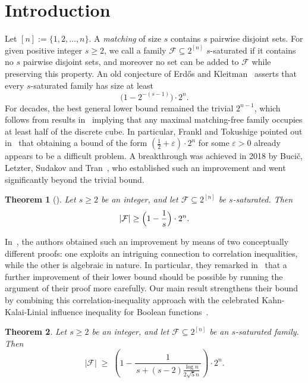 \documentclass[11pt]{article}
\newtheorem{theorem}{Theorem}[section]
\theoremstyle{definition}
\begin{document}
\section{Introduction}
Let $[n]:=\{1,2,\dots,n\}$. A \emph{matching} of size $s$ contains $s$ pairwise disjoint sets. For given positive integer \(s\ge 2\), we call a family $\mathcal{F}\subseteq 2^{[n]}$ \(s\)-saturated if it contains no \(s\) pairwise disjoint sets, and moreover no set can be added to $\mathcal{F}$ while preserving this property. An old conjecture of Erd\H{o}s and Kleitman~\cite{1974ErdosKleitman} asserts that every $s$-saturated family has size at least
\[
\bigl(1-2^{-(s-1)}\bigr)\cdot 2^{n}.
\]
For decades, the best general lower bound remained the trivial \(2^{n-1}\), which follows from results in~\cite{1984ErdosDM,1961EKR} implying that any maximal matching-free family occupies at least half of the discrete cube. In particular, Frankl and Tokushige pointed out in~\cite{2016JCTAFrankl} that obtaining a bound of the form \((\tfrac{1}{2}+\varepsilon)\cdot 2^n\) for some \(\varepsilon>0\) already appears to be a difficult problem. A breakthrough was achieved in 2018 by Buci\v{c}, Letzter, Sudakov and Tran~\cite{2018BLMS}, who established such an improvement and went significantly beyond the trivial bound.
\begin{theorem}[\cite{2018BLMS}]\label{thm:2018BLMS}
    Let \(s\ge 2\) be an integer, and let \(\mathcal{F}\subseteq 2^{[n]}\) be \(s\)-saturated. Then
    \[
        |\mathcal{F}|\ge \Bigl(1-\frac{1}{s}\Bigr)\cdot 2^{n}.
    \]
\end{theorem}
In~\cite{2018BLMS}, the authors obtained such an improvement by means of two conceptually different proofs: one exploits an intriguing connection to correlation inequalities, while the other is algebraic in nature. In particular, they remarked in~\cite{2018BLMS} that a further improvement of their lower bound should be possible by running the argument of their proof more carefully. Our main result strengthens their bound by combining this correlation-inequality approach with the celebrated Kahn-Kalai-Linial influence inequality for Boolean functions~\cite{1988kahanKalaiLinial}.

\begin{theorem}\label{thm:ViaKKL}
    Let \(s\ge 2\) be an integer, and let \(\mathcal{F}\subseteq 2^{[n]}\) be an \(s\)-saturated family. Then
  \[
   |\mathcal{F}|
   \;\ge\;
   \left(
      1 - \frac{1}{\,s + (s-2)\frac{\log n}{2\sqrt{5}n}\,}
   \right)\cdot 2^n.
\]
\end{theorem}
\end{document}
